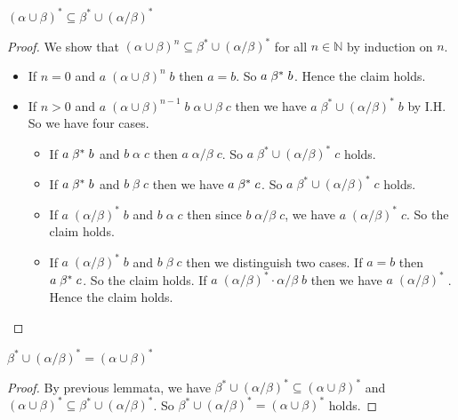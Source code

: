 \documentclass[12pt,aspectratio=169]{beamer}
\begin{document}
\begin{frame}
    \begin{lemma}
        $(\alpha \cup \beta)^* \subseteq \beta^* \cup (\alpha/\beta)^*$
    \end{lemma}
    \begin{proof}
        We show that $(\alpha \cup \beta)^n \subseteq \beta^* \cup (\alpha/\beta)^*$ for all $n \in \mathbb{N}$ by induction on $n$.
        \begin{itemize}
            \item If $n = 0$ and $a\; (\alpha \cup \beta)^n \; b$ then $a =b$. So $a \;\beta^*\; b$.
            Hence the claim holds.   
            \item If $n > 0$ and $a\; (\alpha \cup \beta)^{n-1} \; b \; \alpha \cup \beta\; c$
            then we have $a \;\beta^* \cup (\alpha/\beta)^*\; b$ by I.H. So we have four cases.
            \begin{itemize}
                \item If $a \;\beta^*\; b$ and $b\; \alpha \;c$ then $a\; \alpha/\beta\;c$. So $a\; \beta^* \cup (\alpha/\beta)^*\; c$ holds.
                \item If $a \;\beta^*\; b$ and $b \;\beta\; c$ then we have $a \;\beta^*\; c$. So $a\; \beta^* \cup (\alpha/\beta)^*\; c$ holds.
                \item If $a \; (\alpha/\beta)^*\; b$ and $b \; \alpha \;c$ then
                since $b\; \alpha/\beta\; c$, we have $a \; (\alpha/\beta)^*\; c$. So the claim holds.
                \item If $a \; (\alpha/\beta)^*\; b$ and $b \; \beta \; c$ then we distinguish two cases.
                If $a = b$ then $a \;\beta^*\; c$. So the claim holds.
                If $a \;(\alpha/\beta)^* \cdot \alpha/\beta\; b$ then we have $a \;(\alpha/\beta)^*\;$.
                Hence the claim holds. 
            \end{itemize}
        \end{itemize}
    \end{proof}
\end{frame}

\begin{frame}
    \begin{lemma}
        $\beta^* \cup (\alpha/\beta)^* = (\alpha \cup \beta)^*$
    \end{lemma}
    \begin{proof}
        By previous lemmata, we have
        $\beta^* \cup (\alpha/\beta)^* \subseteq (\alpha \cup \beta)^*$ and
        $(\alpha \cup \beta)^* \subseteq \beta^* \cup (\alpha/\beta)^*$.
        So $\beta^* \cup (\alpha/\beta)^* = (\alpha \cup \beta)^*$ holds.
    \end{proof}
\end{frame}
\end{document}
